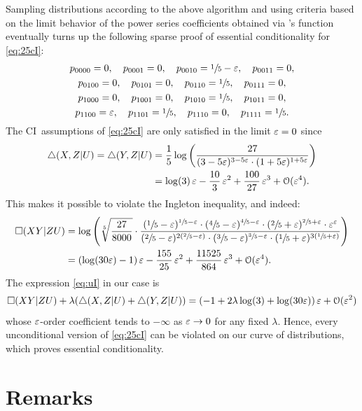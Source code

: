 \documentclass[11pt, a4paper]{tboege-preprint}
\begin{document}
Sampling distributions according to the above algorithm and using criteria
based on the limit behavior of the power series coefficients obtained via
's  function eventually turns up the following
sparse proof of essential conditionality for \eqref{eq:25cI}:
\begin{gather*}
  p_{0000} = 0, \quad
  p_{0001} = 0, \quad
  p_{0010} = \sfrac15 - \varepsilon, \quad
  p_{0011} = 0, \\
  p_{0100} = 0, \quad
  p_{0101} = 0, \quad
  p_{0110} = \sfrac15, \quad
  p_{0111} = 0, \\
  p_{1000} = 0, \quad
  p_{1001} = 0, \quad
  p_{1010} = \sfrac15, \quad
  p_{1011} = 0, \\
  p_{1100} = \varepsilon, \quad
  p_{1101} = \sfrac15, \quad
  p_{1110} = 0, \quad
  p_{1111} = \sfrac15.
\end{gather*}
The CI~assumptions of \eqref{eq:25cI} are only satisfied in the limit
$\varepsilon = 0$ since
\begin{align*}
  \CId{X,Z|U} = \CId{Y,Z|U} &= \frac15 \log\left(\frac{27}{(3 - 5\eps)^{3-5\eps} \cdot (1 + 5\eps)^{1+5\eps}}\right) \\
  &= \log(3) \, \eps - \frac{10}{3} \, \eps^2 + \frac{100}{27} \, \eps^3 + \mathcal{O}(\eps^4).
\end{align*}
This makes it possible to violate the Ingleton inequality, and indeed:
\begin{align*}
  \CIb{XY|ZU} &= \log\left(\sqrt[5]{\frac{27}{8000}} \cdot \frac{(\sfrac15-\eps)^{\sfrac15-\eps} \cdot (\sfrac45-\eps)^{\sfrac45-\eps} \cdot (\sfrac25+\eps)^{\sfrac25+\eps} \cdot \eps^\eps}{(\sfrac25-\eps)^{2(\sfrac25-\eps)} \cdot (\sfrac35-\eps)^{\sfrac35-\eps} \cdot (\sfrac15+\eps)^{3(\sfrac15+\eps)}} \right) \\
  &= (\log(30 \eps) - 1) \, \eps - \frac{155}{25} \, \eps^2 + \frac{11525}{864} \, \eps^3 + \mathcal{O}(\eps^4).
\end{align*}
The expression \eqref{eq:uI} in our case is
\begin{align*}
  \CIb{XY|ZU} + \lambda (\CId{X,Z|U} + \CId{Y,Z|U}) = (-1 + 2 \lambda \log(3) + \log(30 \eps)) \, \eps + \mathcal{O}(\eps^2)
\end{align*}
whose $\varepsilon$-order coefficient tends to $-\infty$ as $\varepsilon \to 0$ for any fixed
$\lambda$. Hence, every unconditional version of \eqref{eq:25cI} can be violated
on our curve of distributions, which proves essential conditionality.

\section{Remarks}
\label{sec:Remarks}
\end{document}
